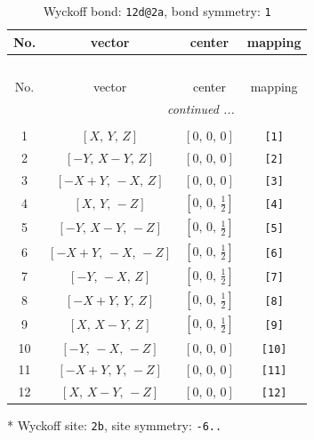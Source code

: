 \documentclass[fleqn,8pt]{jsarticle}
\begin{document}
\begin{longtable}{cccc}
\caption{Wyckoff bond: {\tt 12d@2a}, bond symmetry: {\tt 1}}
 \\
 \hline \hline
No. & vector & center & mapping \\ \hline \endfirsthead

\multicolumn{3}{l}{\tablename\ \thetable{}} \\
 \hline \hline
No. & vector & center & mapping \\ \hline \endhead

 \hline \hline
\multicolumn{3}{r}{\footnotesize\it continued ...} \\ \endfoot

 \hline \hline
\multicolumn{3}{r}{} \\ \endlastfoot

1 & $\left[ X,\, Y,\, Z \right]$ & $\left[ 0,\, 0,\, 0 \right]$ & {\tt [1]} \\ \hline
2 & $\left[ - Y,\, X - Y,\, Z \right]$ & $\left[ 0,\, 0,\, 0 \right]$ & {\tt [2]} \\ \hline
3 & $\left[ - X + Y,\, - X,\, Z \right]$ & $\left[ 0,\, 0,\, 0 \right]$ & {\tt [3]} \\ \hline
4 & $\left[ X,\, Y,\, - Z \right]$ & $\left[ 0,\, 0,\, \frac{1}{2} \right]$ & {\tt [4]} \\ \hline
5 & $\left[ - Y,\, X - Y,\, - Z \right]$ & $\left[ 0,\, 0,\, \frac{1}{2} \right]$ & {\tt [5]} \\ \hline
6 & $\left[ - X + Y,\, - X,\, - Z \right]$ & $\left[ 0,\, 0,\, \frac{1}{2} \right]$ & {\tt [6]} \\ \hline
7 & $\left[ - Y,\, - X,\, Z \right]$ & $\left[ 0,\, 0,\, \frac{1}{2} \right]$ & {\tt [7]} \\ \hline
8 & $\left[ - X + Y,\, Y,\, Z \right]$ & $\left[ 0,\, 0,\, \frac{1}{2} \right]$ & {\tt [8]} \\ \hline
9 & $\left[ X,\, X - Y,\, Z \right]$ & $\left[ 0,\, 0,\, \frac{1}{2} \right]$ & {\tt [9]} \\ \hline
10 & $\left[ - Y,\, - X,\, - Z \right]$ & $\left[ 0,\, 0,\, 0 \right]$ & {\tt [10]} \\ \hline
11 & $\left[ - X + Y,\, Y,\, - Z \right]$ & $\left[ 0,\, 0,\, 0 \right]$ & {\tt [11]} \\ \hline
12 & $\left[ X,\, X - Y,\, - Z \right]$ & $\left[ 0,\, 0,\, 0 \right]$ & {\tt [12]} \\
\end{longtable}
* Wyckoff site: {\tt 2b}, site symmetry: {\tt -6..}
\renewcommand{\arraystretch}{1.2}
\end{document}
